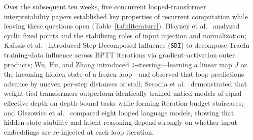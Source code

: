 \documentclass[10pt,letterpaper]{article}
\begin{document}
Over the subsequent ten weeks, five concurrent looped-transformer interpretability papers established key properties of recurrent computation while leaving these questions open (Table~\ref{tab:literature}). Blayney et al.\ \cite{blayney2026mechanistic} analyzed cyclic fixed points and the stabilizing roles of input injection and normalization; Kaissis et al.\ \cite{kaissis2026sdi} introduced Step-Decomposed Influence (\texttt{SDI}) to decompose TracIn training-data influence across BPTT iterations via gradient--activation outer products; Wu, Hu, and Zhang \cite{wu2026shared} introduced \texttt{J}-steering—learning a linear map $J$ on the incoming hidden state of a frozen loop—and observed that loop predictions advance by uneven per-step distances or stall; Sesodia et al.\ \cite{sesodia2026inside} demonstrated that weight-tied transformers outperform identically trained untied models of equal effective depth on depth-bound tasks while forming iteration-budget staircases; and Olszowiec et al.\ \cite{olszowiec2026monitoring} compared eight looped language models, showing that hidden-state stability and latent reasoning depend strongly on whether input embeddings are re-injected at each loop iteration.
\end{document}
